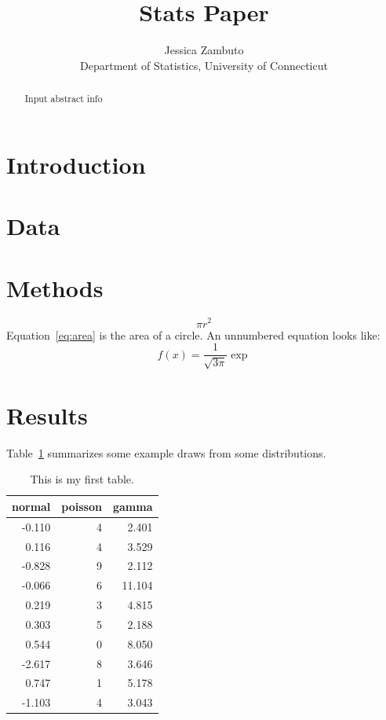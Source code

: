\documentclass[12pt]{article}
\title{Stats Paper}
\author{Jessica Zambuto\\
Department of Statistics, University of Connecticut}
\begin{document}
\maketitle

\begin{abstract}
Input abstract info 	
\end{abstract}

\section{Introduction}
\label{sec:intro}


\section{Data}
\label{sec:data}

\section{Methods}
\label{sec:meth}
\begin{equation}
	\label{eq:area}
	\pi r^2
\end{equation}
Equation~\eqref{eq:area} is the area of a circle.
An unnumbered equation looks like:
\[
f(x)=\frac{1}{\sqrt{3\pi}}\exp
\]

\section{Results}
\label{sec:results}
Table~\ref{tab:rv} summarizes some example draws from some distributions.


\begin{table}[ht]
  \caption{This is my first table.}
  \label{tab:rv}
\centering
\begin{tabular}{rrr}
  \hline
normal & poisson & gamma \\ 
  \hline
-0.110 & 4 & 2.401 \\ 
  0.116 & 4 & 3.529 \\ 
  -0.828 & 9 & 2.112 \\ 
  -0.066 & 6 & 11.104 \\ 
  0.219 & 3 & 4.815 \\ 
  0.303 & 5 & 2.188 \\ 
  0.544 & 0 & 8.050 \\ 
  -2.617 & 8 & 3.646 \\ 
  0.747 & 1 & 5.178 \\ 
  -1.103 & 4 & 3.043 \\ 
   \hline
\end{tabular}
\end{table}
\end{document}
